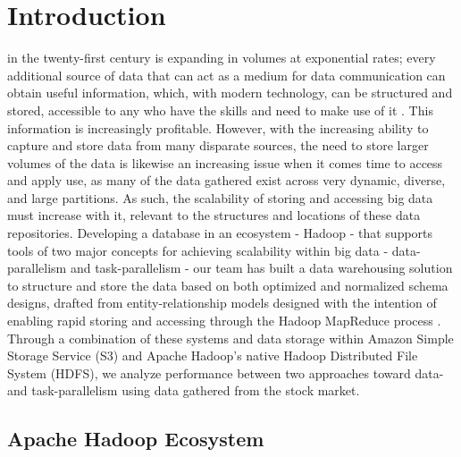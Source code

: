 \documentclass[journal]{IEEEtran}
\begin{document}
	\IEEEpeerreviewmaketitle
	
	
	
	\section{Introduction}
	
	 in the twenty-first century is expanding in volumes
	at exponential rates; every additional source of data that can act as a
	medium for data communication can obtain useful information, which,
	with modern technology, can be structured and stored, accessible to any
	who have the skills and need to make use of it \cite{BigDataComputing}. 
	This information is increasingly profitable. 
	However, with the increasing ability to capture and store data from many
	disparate sources, the need to store larger volumes of the data is
	likewise an increasing issue when it comes time to access and apply use,
	as many of the data gathered exist across very dynamic, diverse, and
	large partitions. 
	As such, the scalability of storing and accessing big data must increase
	with it, relevant to the structures and locations of these data repositories. 
	Developing a database in an ecosystem - Hadoop - that supports tools of
	two major concepts for achieving scalability within big data -
	data-parallelism and task-parallelism - our team has built a data
	warehousing solution to structure and store the data based on both
	optimized and normalized schema designs, drafted from entity-relationship
	models designed with the intention of enabling rapid storing and accessing
	through the Hadoop MapReduce process \cite{BigDataComputing}. 
	Through a combination of these systems and data storage within
	Amazon Simple Storage Service (S3) and Apache Hadoop's native Hadoop
	Distributed File System (HDFS), we analyze performance between two
	approaches toward data- and task-parallelism using data gathered from
	the stock market.
	
	\subsection{Apache Hadoop Ecosystem}
	
\end{document}
